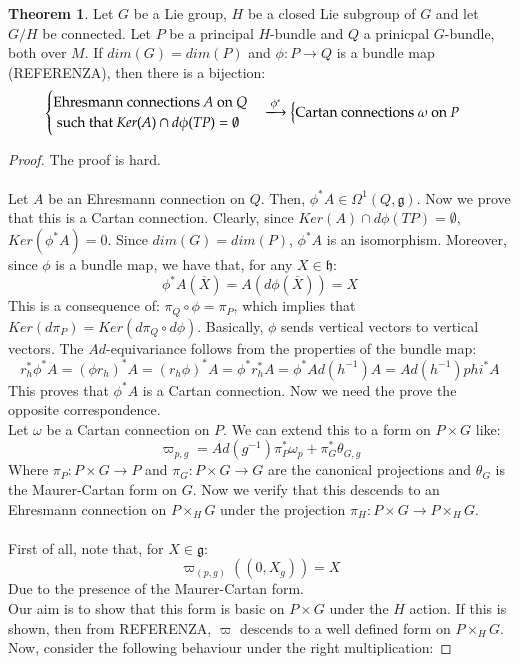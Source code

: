 \documentclass[12pt,a4paper]{report}
\theoremstyle{definition}
\theoremstyle{Theorem}
\newtheorem{Theo}[Def]{Theorem}
\theoremstyle{break}
\theoremstyle{definition}
\begin{document}
	\begin{Theo}
		Let $G$ be a Lie group, $H$ be a closed Lie subgroup of $G$ and let $G/H$ be connected. Let $P$ be a principal $H$-bundle and $Q$ a prinicpal $G$-bundle, both over $M$. If $dim(G)=dim(P)$ and $\phi:P\rightarrow  Q$ is a bundle map (REFERENZA), then there is a bijection:
		$$\begin{cases}
			\hbox{Ehresmann connections } A \hbox{ on } Q \\ \hbox{ such that } Ker(A)\cap d\phi(TP)=\emptyset
		\end{cases}\xlongrightarrow{\phi^*} \begin{cases}
		\hbox{Cartan connections } \omega \hbox{ on } P
		\end{cases}$$
	\end{Theo}
	\begin{proof}
		The proof is hard.\\
		\\
		Let $A$ be an Ehresmann connection on $Q$. Then, $\phi^*A\in\Omega^1(Q,\mathfrak{g})$. Now we prove that this is a Cartan connection. Clearly, since $Ker(A)\cap d\phi(TP)=\emptyset$, $Ker(\phi^*A)=0$. Since $dim(G)=dim(P)$, $\phi^*A$ is an isomorphism. Moreover, since $\phi$ is a bundle map, we have that, for any $X\in\mathfrak{h}$:
		$$\phi^*A(\overline{X})=A(d\phi(\overline{X}))=X$$
		This is a consequence of: $\pi_Q\circ\phi=\pi_P$, which implies that $Ker(d\pi_P)=Ker(d\pi_Q\circ d\phi)$. Basically, $\phi$ sends vertical vectors to vertical vectors. The $Ad$-equivariance follows from the properties of the bundle map:
		$$r_h^*\phi^*A=(\phi r_h)^*A=( r_h\phi)^*A=\phi^*r_h^*A=\phi^*Ad(h^{-1})A=Ad(h^{-1})phi^*A$$
		This proves that $\phi^*A$ is a Cartan connection. Now we need the prove the opposite correspondence.
		\\
		Let $\omega$ be a Cartan connection on $P$. We can extend this to a form on $P\times G$ like:
		$$\varpi_{p,g}=Ad(g^{-1})\pi^*_P\omega_p+\pi^*_G\theta_{G,g}$$
		Where $\pi_P:P\times G\rightarrow P$ and $\pi_G:P\times G\rightarrow G$ are the canonical projections and $\theta_G$ is the Maurer-Cartan form on $G$. Now we verify that this descends to an Ehresmann connection on $P\times_H G$ under the projection $\pi_H:P\times G\rightarrow P\times_H G$.
		\\\\ 
		First of all, note that, for $X\in\mathfrak{g}$:
		$$\varpi_{(p,g)}((0,X_g))=X$$
		Due to the presence of the Maurer-Cartan form.\\
		Our aim is to show that this form is basic on $P\times G$ under the $H$ action. If this is shown, then from REFERENZA, $\varpi$ descends to a well defined form on $P\times_H G$. Now, consider the following behaviour under the right multiplication:

\end{proof}
\end{document}
